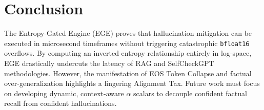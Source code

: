 \documentclass[conference,compsoc]{IEEEtran}
\begin{document}
\section{Conclusion}
The Entropy-Gated Engine (EGE) proves that hallucination mitigation can be executed in microsecond timeframes without triggering catastrophic \texttt{bfloat16} overflows. By computing an inverted entropy relationship entirely in log-space, EGE drastically undercuts the latency of RAG and SelfCheckGPT methodologies. However, the manifestation of EOS Token Collapse and factual over-generalization highlights a lingering Alignment Tax. Future work must focus on developing dynamic, context-aware $\alpha$ scalars to decouple confident factual recall from confident hallucinations.

\end{document}
